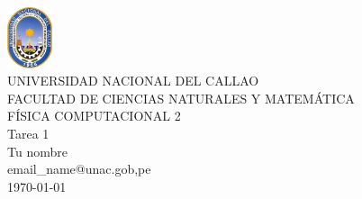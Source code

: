 \documentclass[10pt,a4paper]{article}
\makeatletter
\newcommand{\myUniversidad}{UNIVERSIDAD NACIONAL DEL CALLAO}
\newcommand{\myFacultad}{FACULTAD DE CIENCIAS NATURALES Y MATEM\'ATICA}
\newcommand{\myCurso}{F\'ISICA COMPUTACIONAL 2}
\newcommand{\myTarea }{Tarea }
\newcommand{\myNombre}{Tu nombre}
\newcommand{\myEmail}{email\_name@unac.gob,pe}
\newcommand{\myNumTarea}{1}
\makeatother
\begin{document}

\thispagestyle{plain} %
\begin{center} 
\includegraphics[width=0.1\textwidth]{Escudo_UNAC.png}\\[.5cm]
\Large{                 %
\myUniversidad\\
\myFacultad\\ 
\myCurso\\
{\myTarea \myNumTarea}\\
\myNombre\\
\myEmail\\
\today}
\end{center} 

\centerline{\underline{\hspace{7in}}}
\end{document}

